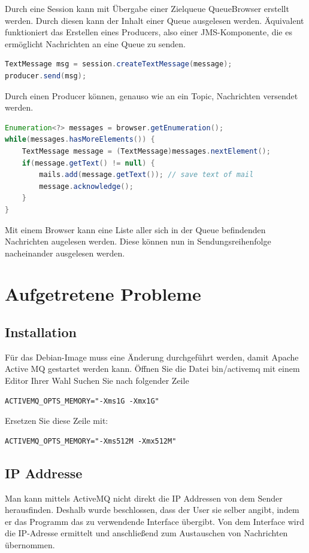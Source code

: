 \documentclass[11pt, a4paper]{article}
\begin{document}
Durch eine Session kann mit Übergabe einer Zielqueue QueueBrowser erstellt werden. Durch diesen kann der Inhalt einer Queue ausgelesen werden.
Äquivalent funktioniert das Erstellen eines Producers, also einer JMS-Komponente, die es ermöglicht Nachrichten an eine Queue zu senden.

\begin{lstlisting}[language=Java]
TextMessage msg = session.createTextMessage(message);
producer.send(msg);
\end{lstlisting}

Durch einen Producer können, genauso wie an ein Topic, Nachrichten versendet werden.

\begin{lstlisting}[language=Java]
Enumeration<?> messages = browser.getEnumeration();
while(messages.hasMoreElements()) {
	TextMessage message = (TextMessage)messages.nextElement();
	if(message.getText() != null) {
		mails.add(message.getText()); // save text of mail
		message.acknowledge();
	}
}
\end{lstlisting}

Mit einem Browser kann eine Liste aller sich in der Queue befindenden Nachrichten augelesen werden. Diese können nun in Sendungsreihenfolge nacheinander
ausgelesen werden.

\newpage

\section{Aufgetretene Probleme}

\subsection{Installation}

Für das Debian-Image muss eine Änderung durchgeführt werden, damit Apache Active MQ gestartet werden kann.
Öffnen Sie die Datei bin/activemq mit einem Editor Ihrer Wahl 
Suchen Sie nach folgender Zeile
\begin{lstlisting}
ACTIVEMQ_OPTS_MEMORY="-Xms1G -Xmx1G"
\end{lstlisting}
Ersetzen Sie diese Zeile mit:
\begin{lstlisting}
ACTIVEMQ_OPTS_MEMORY="-Xms512M -Xmx512M"
\end{lstlisting}
\subsection{IP Addresse}
Man kann mittels ActiveMQ nicht direkt die IP Addressen von dem Sender herausfinden.
Deshalb wurde beschlossen, dass der User sie selber angibt, indem er das Programm das zu verwendende Interface übergibt. Von dem Interface wird die IP-Adresse ermittelt und anschließend zum Austauschen von Nachrichten übernommen.
\end{document}
